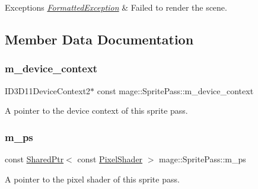 \begin{DoxyExceptions}{Exceptions}
{\em \hyperlink{structmage_1_1_formatted_exception}{Formatted\+Exception}} & Failed to render the scene. \\
\hline
\end{DoxyExceptions}


\subsection{Member Data Documentation}
\hypertarget{classmage_1_1_sprite_pass_a483bd82ef7dbeaa384c5c763f5b03949}{}\label{classmage_1_1_sprite_pass_a483bd82ef7dbeaa384c5c763f5b03949} 
\subsubsection{\texorpdfstring{m\+\_\+device\+\_\+context}{m\_device\_context}}
{\footnotesize\ttfamily I\+D3\+D11\+Device\+Context2$\ast$ const mage\+::\+Sprite\+Pass\+::m\+\_\+device\+\_\+context\hspace{0.3cm}{\ttfamily [private]}}

A pointer to the device context of this sprite pass. \hypertarget{classmage_1_1_sprite_pass_a03965c38e565dbf0cbabdb35bc836124}{}\label{classmage_1_1_sprite_pass_a03965c38e565dbf0cbabdb35bc836124} 
\subsubsection{\texorpdfstring{m\+\_\+ps}{m\_ps}}
{\footnotesize\ttfamily const \hyperlink{namespacemage_a1e01ae66713838a7a67d30e44c67703e}{Shared\+Ptr}$<$ const \hyperlink{namespacemage_a27ecaf266420ee7a494d64edc0757129}{Pixel\+Shader} $>$ mage\+::\+Sprite\+Pass\+::m\+\_\+ps\hspace{0.3cm}{\ttfamily [private]}}

A pointer to the pixel shader of this sprite pass. \hypertarget{classmage_1_1_sprite_pass_a9083152ae0681429df4dd0fce533f7dc}{}\label{classmage_1_1_sprite_pass_a9083152ae0681429df4dd0fce533f7dc} 
